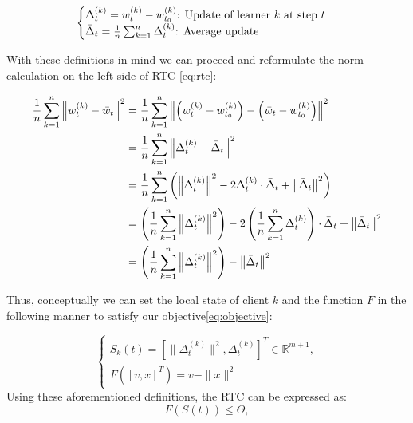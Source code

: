 \begin{equation}
    \label{eq:learner_update}
    \begin{cases}
        \Delta_t^{(k)} = w_t^{(k)} - w_{t_0}^{(k)} \text{: Update of learner \( k \) at step \( t \)} \\
        \bar{\Delta}_t = \frac{1}{n} \sum_{k=1}^{n} \Delta_t^{(k)} \text{: Average update}
    \end{cases}
\end{equation}

\noindent
With these definitions in mind we can proceed and reformulate the norm calculation on the left side of RTC \cref{eq:rtc}:\

\begin{align}
    \frac{1}{n} \sum_{k=1}^{n} \left\| w_t^{(k)} - \bar{w}_t \right\|^2
     & = \frac{1}{n} \sum_{k=1}^{n} \left\| \left(w_t^{(k)} - w_{t_0}^{(k)}\right) - \left( \bar{w}_t - w_{t_0}^{(k)} \right) \right\|^2 \notag                                                                   \\
     & = \frac{1}{n} \sum_{k=1}^{n} \left\| \Delta_t^{(k)} - \bar{\Delta}_t \right\|^2 \notag                                                                                                                     \\
     & = \frac{1}{n} \sum_{k=1}^{n} \left( \left\| \Delta_t^{(k)} \right\|^2 - 2 \Delta_t^{(k)} \cdot \bar{\Delta}_t + \left\| \bar{\Delta}_t \right\|^2 \right) \notag                                           \\
     & = \left( \frac{1}{n} \sum_{k=1}^{n} \left\| \Delta_t^{(k)} \right\|^2 \right) - 2 \left( \frac{1}{n} \sum_{k=1}^{n} \Delta_t^{(k)} \right) \cdot \bar{\Delta}_t + \left\| \bar{\Delta}_t \right\|^2 \notag \\
     & = \left( \frac{1}{n} \sum_{k=1}^{n} \left\| \Delta_t^{(k)} \right\|^2 \right) - \left\| \bar{\Delta}_t \right\|^2
    \label{eq:variance_calc}
\end{align}

\noindent
Thus, conceptually we can set the local state of client $k$ and the function $F$ in the following manner to satisfy our objective\cref{eq:objective}:

\begin{equation}
    \label{eq:local_state_and_function}
    \begin{cases}
        S_k(t) = \left[ \| \Delta_t^{(k)} \|^2, \Delta_t^{(k)} \right]^T \in \mathbb{R}^{m+1}, \\
        F\left( \left[ v, x \right]^T \right) = v - \| x \|^2
    \end{cases}
\end{equation}
\noindent
Using these aforementioned definitions, the RTC can be expressed as:
\[
    F(S(t)) \leq \Theta,
\]

